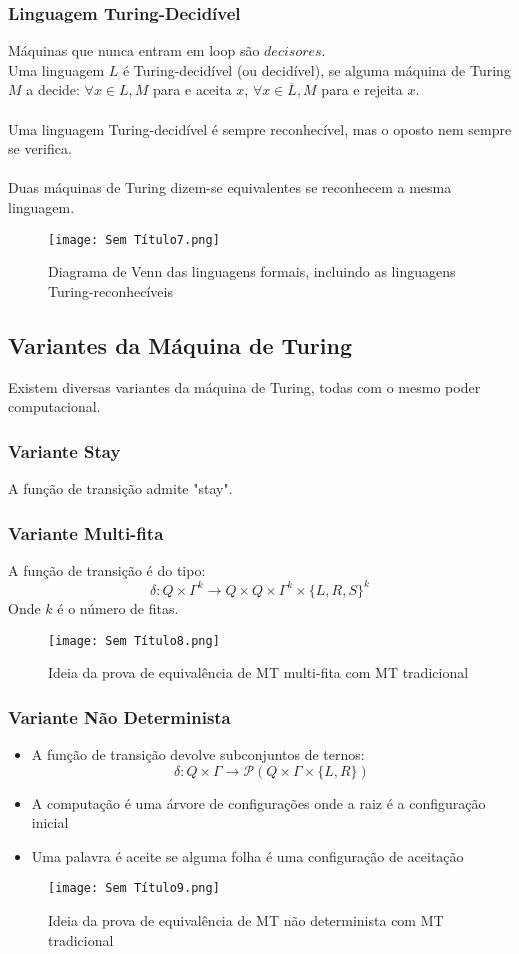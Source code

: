 \documentclass[10pt,a4paper]{report}
\begin{document}
\subsubsection{Linguagem Turing-Decidível}
Máquinas que nunca entram em loop são $decisores$.\\
Uma linguagem $L$ é Turing-decidível (ou decidível), se alguma máquina de Turing $M$ a decide: $\forall x \in L, M$ para e aceita $x$, $\forall x \in \overline{L}, M$ para e rejeita $x$.\\
\\
Uma linguagem Turing-decidível é sempre reconhecível, mas o oposto nem sempre se verifica.\\
\\
Duas máquinas de Turing dizem-se equivalentes se reconhecem a mesma linguagem.
\begin{figure}[H]
\centering
\texttt{[image: Sem Título7.png]}
\caption{Diagrama de Venn das linguagens formais, incluindo as linguagens Turing-reconhecíveis}
\end{figure}
\subsection{Variantes da Máquina de Turing}
Existem diversas variantes da máquina de Turing, todas com o mesmo poder computacional.
\subsubsection{Variante Stay}
A função de transição admite "stay".
\subsubsection{Variante Multi-fita}
A função de transição é do tipo:
$$
\delta: Q \times \Gamma^k \rightarrow Q \times Q \times \Gamma^k \times \{L,R,S\}^k
$$
Onde $k$ é o número de fitas. 
\begin{figure}[H]
\centering
\texttt{[image: Sem Título8.png]}
\caption{Ideia da prova de equivalência de MT multi-fita com MT tradicional}
\end{figure}
\subsubsection{Variante Não Determinista}
\begin{itemize}
\item A função de transição devolve subconjuntos de ternos:
$$
\delta: Q \times \Gamma \rightarrow \mathcal{P}(Q\times \Gamma \times \{L,R\})
$$
\item A computação é uma árvore de configurações onde a raiz é a configuração inicial
\item Uma palavra é aceite se alguma folha é uma configuração de aceitação
\end{itemize}
\begin{figure}[H]
\centering
\texttt{[image: Sem Título9.png]}
\caption{Ideia da prova de equivalência de MT não determinista com MT tradicional}
\end{figure}
\end{document}
